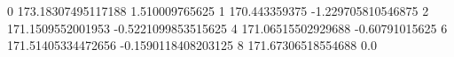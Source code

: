 0 173.18307495117188 1.510009765625
1 170.443359375 -1.229705810546875
2 171.1509552001953 -0.5221099853515625
4 171.06515502929688 -0.60791015625
6 171.51405334472656 -0.1590118408203125
8 171.67306518554688 0.0
